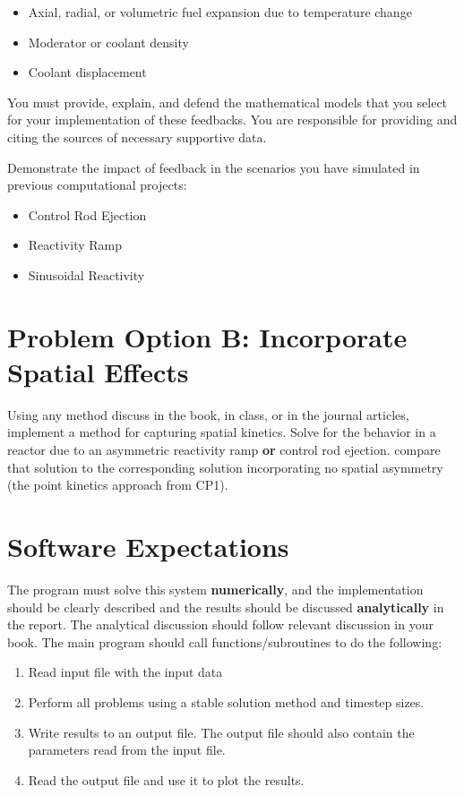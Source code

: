 \documentclass{article}
\begin{document}
\begin{itemize}
        \item Axial, radial, or volumetric fuel expansion due to temperature change
        \item Moderator or coolant density 
        \item Coolant displacement
\end{itemize}

You must provide, explain, and defend the mathematical models that you select for 
your implementation of these feedbacks. You are responsible for providing 
and citing the sources of necessary supportive data.

Demonstrate the impact of feedback in the scenarios you have simulated in 
previous computational projects:

\begin{itemize}
        \item Control Rod Ejection
        \item Reactivity Ramp
        \item Sinusoidal Reactivity 
\end{itemize}



\section{Problem Option B: Incorporate Spatial Effects}
Using any method discuss in the book, in class, or in the journal articles, 
implement a method for capturing spatial kinetics. Solve for the behavior in a 
reactor due to an asymmetric reactivity ramp \textbf{or} control rod ejection. 
compare that solution to the corresponding solution incorporating no spatial 
asymmetry (the point kinetics approach from CP1).

\section{Software Expectations}

The program must solve this system \textbf{numerically}, and the 
implementation should be clearly described and the results should be discussed 
\textbf{analytically} in the report.  The analytical discussion should 
follow relevant discussion in your book.  The main program should 
call functions/subroutines to do the following:

\begin{enumerate}
        \item Read input file with the input data
        \item Perform all problems using a stable solution method and 
                timestep sizes.
        \item Write results to an output file.  The output file should also 
                contain the parameters read from the input file.
        \item Read the output file and use it to plot the results.
\end{enumerate}
\end{document}
